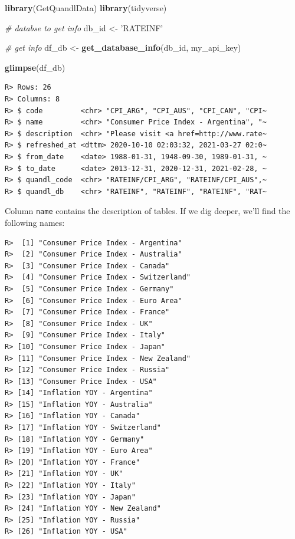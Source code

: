 \documentclass[
  12pt,
]{book}
\newenvironment{Shaded}{\begin{snugshade}}{\end{snugshade}}
\newcommand{\CommentTok}[1]{\textcolor[rgb]{0.37,0.37,0.37}{\textit{#1}}}
\newcommand{\KeywordTok}[1]{\textcolor[rgb]{0.27,0.27,0.27}{\textbf{#1}}}
\newcommand{\NormalTok}[1]{#1}
\newcommand{\OperatorTok}[1]{\textcolor[rgb]{0.43,0.43,0.43}{\textbf{#1}}}
\newcommand{\StringTok}[1]{\textcolor[rgb]{0.5,0.5,0.5}{#1}}
\begin{document}
\begin{Shaded}
\begin{Highlighting}[]
\KeywordTok{library}\NormalTok{(GetQuandlData)}
\KeywordTok{library}\NormalTok{(tidyverse)}

\CommentTok{# databse to get info}
\NormalTok{db_id <-}\StringTok{ 'RATEINF'}

\CommentTok{# get info }
\NormalTok{df_db <-}\StringTok{ }\KeywordTok{get_database_info}\NormalTok{(db_id, my_api_key)}

\KeywordTok{glimpse}\NormalTok{(df_db)}
\end{Highlighting}
\end{Shaded}

\begin{verbatim}
R> Rows: 26
R> Columns: 8
R> $ code         <chr> "CPI_ARG", "CPI_AUS", "CPI_CAN", "CPI~
R> $ name         <chr> "Consumer Price Index - Argentina", "~
R> $ description  <chr> "Please visit <a href=http://www.rate~
R> $ refreshed_at <dttm> 2020-10-10 02:03:32, 2021-03-27 02:0~
R> $ from_date    <date> 1988-01-31, 1948-09-30, 1989-01-31, ~
R> $ to_date      <date> 2013-12-31, 2020-12-31, 2021-02-28, ~
R> $ quandl_code  <chr> "RATEINF/CPI_ARG", "RATEINF/CPI_AUS",~
R> $ quandl_db    <chr> "RATEINF", "RATEINF", "RATEINF", "RAT~
\end{verbatim}

Column \texttt{name} contains the description of tables. If we dig deeper, we'll find the following names:

\begin{Shaded}
\end{Shaded}

\begin{verbatim}
R>  [1] "Consumer Price Index - Argentina"  
R>  [2] "Consumer Price Index - Australia"  
R>  [3] "Consumer Price Index - Canada"     
R>  [4] "Consumer Price Index - Switzerland"
R>  [5] "Consumer Price Index - Germany"    
R>  [6] "Consumer Price Index - Euro Area"  
R>  [7] "Consumer Price Index - France"     
R>  [8] "Consumer Price Index - UK"         
R>  [9] "Consumer Price Index - Italy"      
R> [10] "Consumer Price Index - Japan"      
R> [11] "Consumer Price Index - New Zealand"
R> [12] "Consumer Price Index - Russia"     
R> [13] "Consumer Price Index - USA"        
R> [14] "Inflation YOY - Argentina"         
R> [15] "Inflation YOY - Australia"         
R> [16] "Inflation YOY - Canada"            
R> [17] "Inflation YOY - Switzerland"       
R> [18] "Inflation YOY - Germany"           
R> [19] "Inflation YOY - Euro Area"         
R> [20] "Inflation YOY - France"            
R> [21] "Inflation YOY - UK"                
R> [22] "Inflation YOY - Italy"             
R> [23] "Inflation YOY - Japan"             
R> [24] "Inflation YOY - New Zealand"       
R> [25] "Inflation YOY - Russia"            
R> [26] "Inflation YOY - USA"
\end{verbatim}
\end{document}
